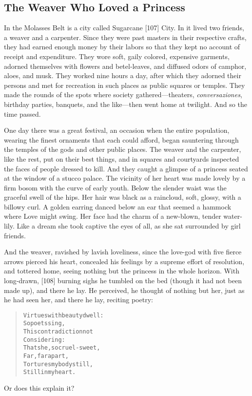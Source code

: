 \documentclass[article, twoside, 14pt]{memoir}
\renewenvironment{verbatim}{%
\begin{quote}%
\vskip -10pt%
\begin{alltt}\normalfont\large}{\end{alltt}%
\end{quote}%
\vskip -10pt
} %
\begin{document}
\subsection{The Weaver Who Loved a Princess}

\label{s11}

In the Molasses Belt is a city called Sugarcane [107] City. In it
lived two friends, a weaver and a carpenter. Since they were past
masters in their respective crafts, they had earned enough money by
their labors so that they kept no account of receipt and
expenditure. They wore soft, gaily colored, expensive garments,
adorned themselves with flowers and betel-leaves, and diffused
odors of camphor, aloes, and musk. They worked nine hours a day,
after which they adorned their persons and met for recreation in
such places as public squares or temples. They made the rounds of
the spots where society gathered---theaters, \emph{conversaziones},
birthday parties, banquets, and the like---then went home at
twilight. And so the time passed.

One day there was a great festival, an occasion when the entire
population, wearing the finest ornaments that each could afford,
began sauntering through the temples of the gods and other public
places. The weaver and the carpenter, like the rest, put on their
best things, and in squares and courtyards inspected the faces of
people dressed to kill. And they caught a glimpse of a princess
seated at the window of a stucco palace. The vicinity of her heart
was made lovely by a firm bosom with the curve of early youth.
Below the slender waist was the graceful swell of the hips. Her
hair was black as a raincloud, soft, glossy, with a billowy curl. A
golden earring danced below an ear that seemed a hammock where Love
might swing. Her face had the charm of a new-blown, tender
water-lily. Like a dream she took captive the eyes of all, as she
sat surrounded by girl friends.

And the weaver, ravished by lavish loveliness, since the love-god
with five fierce arrows pierced his heart, concealed his feelings
by a supreme effort of resolution, and tottered home, seeing
nothing but the princess in the whole horizon. With long-drawn,
[108] burning sighs he tumbled on the bed (though it had not been
made up), and there he lay. He perceived, he thought of nothing but
her, just as he had seen her, and there he lay, reciting poetry:

\begin{verbatim}
Virtues with beauty dwell:
    So poets sing,
This contradiction not
    Considering:
That she, so cruel-sweet,
    Far, far apart,
Tortures my body still,
    Still in my heart.
\end{verbatim}
Or does this explain it?
\end{document}
